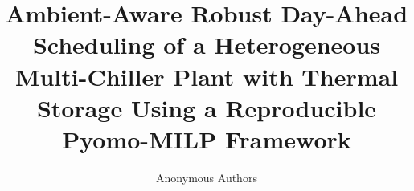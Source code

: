 \documentclass[11pt]{article}
\title{Ambient-Aware Robust Day-Ahead Scheduling of a Heterogeneous Multi-Chiller Plant with Thermal Storage Using a Reproducible Pyomo-MILP Framework}
\author{Anonymous Authors}
\date{}
\begin{document}
\maketitle

\begin{abstract}

\end{abstract}










\appendix

\end{document}
